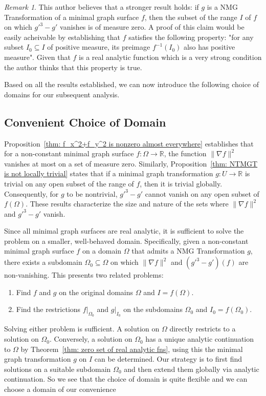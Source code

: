 \documentclass[12pt]{article}
\theoremstyle{plain}
\theoremstyle{definition}
\theoremstyle{remark}
\newtheorem{remark}[theorem]{Remark}
\begin{document}
   \begin{remark}
   	   This author believes that a stronger result holds: if \(g\) is a NMG Transformation of a minimal graph surface \(f\), then the subset of the range \(I\) of \(f\) on which \(g\prime^3 - g\prime\) vanishes is of measure zero. A proof of this claim would be easily acheivable by establishing that \(f\) satisfies the following property: "for any subset \(I_0 \subseteq I\) of positive measure, its preimage \(f^{-1}(I_0)\) also has positive measure". Given that \(f\) is a real analytic function which is a very strong condition the author thinks that this property is true.
   \end{remark}
   
   
    Based on all the results established, we can now introduce the following choice of domains for our subsequent analysis.
   
    \subsection{Convenient Choice of Domain}\label{section: assumptions}
    Proposition~\ref{thm: f_x^2+f_y^2 is nonzero almost everywhere} establishes that for a non-constant minimal graph surface \( f : \Omega \longrightarrow \mathbb{R} \), the function \(\|\nabla f\|^2\) vanishes at most on a set of measure zero. Similarly, Proposition~\ref{thm: NTMGT is not locally trivial} states that if a minimal graph transformation \(g: U \longrightarrow \mathbb{R}\) is trivial on any open subset of the range of \(f\), then it is trivial globally. Consequently, for \(g\) to be nontrivial, \(g\prime^3 - g\prime\) cannot vanish on any open subset of \(f(\Omega)\). These results characterize the size and nature of the sets where \(\|\nabla f\|^2\) and \(g\prime^3 - g\prime\) vanish.
    
    Since all minimal graph surfaces are real analytic, it is sufficient to solve the problem on a smaller, well-behaved domain. Specifically, given a non-constant minimal graph surface \(f\) on a domain \(\Omega\) that admits a NMG Transformation \(g\), there exists a subdomain \(\Omega_0 \subseteq \Omega\) on which \(\|\nabla f\|^2\) and \((g\prime^3 - g\prime)(f)\) are non-vanishing. This presents two related problems:
    \begin{enumerate}
    	\item Find \(f\) and \(g\) on the original domains \(\Omega\) and \(I = f(\Omega)\).
    	\item Find the restrictions \(f|_{\Omega_0}\) and \(g|_{I_0}\) on the subdomains \(\Omega_0\) and \(I_0 = f(\Omega_0)\).
    \end{enumerate}
    Solving either problem is sufficient. A solution on \(\Omega\) directly restricts to a solution on \(\Omega_0\). Conversely, a solution on \(\Omega_0\) has a unique analytic continuation to \(\Omega\) by Theorem~\ref{thm: zero set of real analytic fns}, using this the minimal graph transformation \(g\) on \(I\) can be determined. Our strategy is to first find solutions on a suitable subdomain \(\Omega_0\) and then extend them globally via analytic continuation. So we see that the choice of domain is quite flexible and we can choose a domain of our convenience
    
\end{document}
